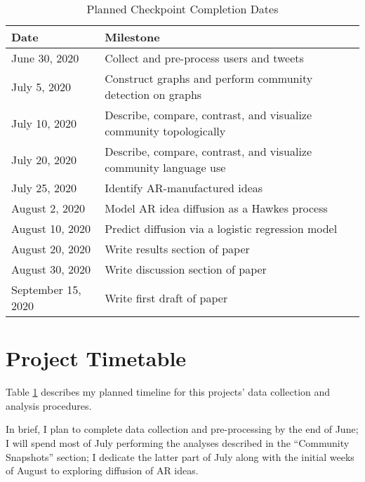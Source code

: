 \documentclass[acmlarge, screen, authorversion]{acmart}
\begin{document}
\begin{table}[htbp!]

	\caption{Planned Checkpoint Completion Dates}
	\label{table:timetable}

	\begin{tabular}{ l l  }

		\toprule
		Date               & Milestone                                                          \\
		\midrule
		June 30, 2020      & Collect and pre-process users and tweets                           \\
		\hline
		July 5, 2020       & Construct graphs and perform community detection on graphs         \\
		\hline
		July 10, 2020      & Describe, compare, contrast, and visualize community topologically \\
		\hline
		July 20, 2020      & Describe, compare, contrast, and visualize community language use  \\
		\hline
		July 25, 2020      & Identify AR-manufactured ideas                                     \\
		\hline
		August 2, 2020     & Model AR idea diffusion as a Hawkes process                        \\
		\hline
		August 10, 2020    & Predict diffusion via a logistic regression model                  \\
		\hline
		August 20, 2020    & Write results section of paper                                     \\
		\hline
		August 30, 2020    & Write discussion section of paper                                  \\
		\hline
		September 15, 2020 & Write first draft of paper                                         \\
		\bottomrule
	\end{tabular}
\end{table}

\section{Project Timetable}

Table \ref{table:timetable} describes my planned timeline for this projects' data collection and analysis procedures.

In brief, I plan to complete data collection and pre-processing by the end of June; I will spend most of July performing the analyses described in the ``Community Snapshots'' section; I dedicate the latter part of July along with the initial weeks of August to exploring diffusion of AR ideas.

\clearpage


\end{document}
